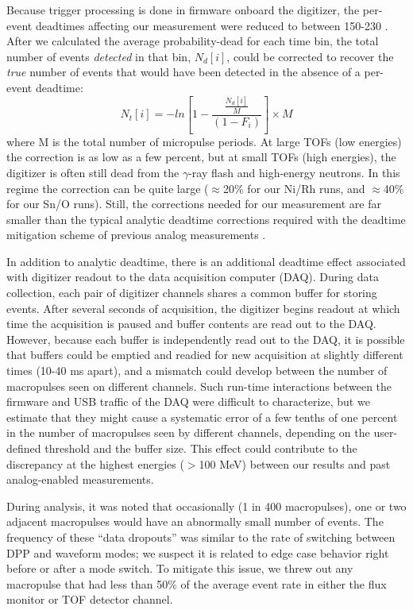 \documentclass[twocolumn,secnumarabic,amssymb, nobibnotes, aps, prl,
superscriptaddress, nobalancelastpage, draft]{revtex4}
\begin{document}
Because trigger processing is done in firmware onboard the digitizer,
the per-event deadtimes affecting our
measurement were reduced to between 150-230 \nano\second.
After we calculated the average probability-dead for each time bin,
the total number of events \textit{detected} in that bin, $N_{d}[i]$, could be
corrected to recover the \textit{true} number of events that would have been
detected in the absence of a per-event deadtime:
\begin{equation}
    N_{t}[i] = -ln\left[1-\frac{\frac{N_{d}[i]}{M}}{(1-F_{i})}\right]\times M
\end{equation}
where M is the total number of micropulse periods. At large TOFs (low energies) 
the correction is as low as a few percent,
but at small TOFs (high energies), the digitizer is often still dead
from the $\gamma$-ray flash and high-energy neutrons. In this regime
the correction can be quite large ($\approx$20\% for our Ni/Rh runs,
and $\approx$40\% for our Sn/O runs). Still, the corrections needed for our measurement
are far smaller than the typical analytic deadtime corrections required
with the deadtime mitigation scheme of previous analog measurements \cite{Finlay1993,
Abfalterer2001}.

In addition to analytic deadtime, there is an additional deadtime effect associated with 
digitizer readout to the data acquisition computer (DAQ). During data
collection, each pair of digitizer channels shares a common buffer for storing events.
After several seconds of acquisition, the digitizer begins readout at which time the
acquisition is paused and buffer contents are read out to the DAQ. However,
because each buffer is independently read out to the DAQ, it is possible that buffers
could be emptied and readied for new acquisition at slightly different times
(10-40 ms apart), and a mismatch could develop between the number of macropulses
seen on different channels. Such run-time interactions between the firmware and USB
traffic of the DAQ were difficult to characterize, but we estimate that they might cause a 
systematic error of a few tenths of one percent in the number of macropulses seen
by different channels, depending on the user-defined 
threshold and the buffer size. This effect could contribute to the discrepancy at the
highest energies ($>$100 MeV) between our results and past analog-enabled
measurements.

During analysis, it was noted that occasionally (1 in 400 macropulses), one or two 
adjacent macropulses would have an abnormally small number of events. The frequency
of these ``data dropouts'' was similar to the rate of
switching between DPP and waveform modes; we suspect it is related to edge
case behavior right before or after a mode switch. To mitigate this issue,
we threw out any macropulse that had less than 50\% of the average event rate in either the
flux monitor or TOF detector channel.
\end{document}
